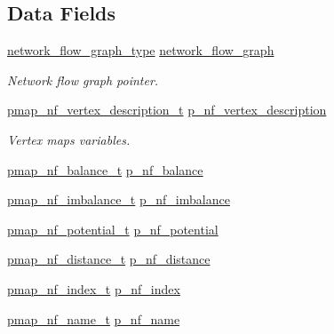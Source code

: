 \subsection*{Data Fields}
\begin{DoxyCompactItemize}
\item 
\hyperlink{classnetwork__flow_abfdb8d1baba183c2b121f8c078b9b640}{network\+\_\+flow\+\_\+graph\+\_\+type} \hyperlink{classnetwork__flow_ad9ab04ac79b18ed458320576340d14d7}{network\+\_\+flow\+\_\+graph}
\begin{DoxyCompactList}\small\item\em Network flow graph pointer. \end{DoxyCompactList}\item 
\hyperlink{classnetwork__flow_a74ecf4431065049cd8c880b82b2b1a2c}{pmap\+\_\+nf\+\_\+vertex\+\_\+description\+\_\+t} \hyperlink{classnetwork__flow_a9c07823ba97add0bb2d94897bc4cb12d}{p\+\_\+nf\+\_\+vertex\+\_\+description}
\begin{DoxyCompactList}\small\item\em Vertex maps variables. \end{DoxyCompactList}\item 
\hyperlink{classnetwork__flow_adb6c2e7def8309b3a5f660dd40a758e8}{pmap\+\_\+nf\+\_\+balance\+\_\+t} \hyperlink{classnetwork__flow_a71c741226f50fdb317a03df0d13c99a1}{p\+\_\+nf\+\_\+balance}
\item 
\hyperlink{classnetwork__flow_a5760a4393bb7caf9af993443e209de05}{pmap\+\_\+nf\+\_\+imbalance\+\_\+t} \hyperlink{classnetwork__flow_a30967a48a78946a8a69ccb96a97c71eb}{p\+\_\+nf\+\_\+imbalance}
\item 
\hyperlink{classnetwork__flow_a27c9b52e67a89ed0f6584017fdf365a5}{pmap\+\_\+nf\+\_\+potential\+\_\+t} \hyperlink{classnetwork__flow_aaa333405d94f8f54981e5788d9530e8a}{p\+\_\+nf\+\_\+potential}
\item 
\hyperlink{classnetwork__flow_a2341f0fc871494e5fa44bc4fe5967a0e}{pmap\+\_\+nf\+\_\+distance\+\_\+t} \hyperlink{classnetwork__flow_afdcfa3c541708c8f34c6ff0629f37645}{p\+\_\+nf\+\_\+distance}
\item 
\hyperlink{classnetwork__flow_a8f87f8e2ed2e6d081d66eba9ea1b284c}{pmap\+\_\+nf\+\_\+index\+\_\+t} \hyperlink{classnetwork__flow_a26b0c291ee60a72f13348727b307f226}{p\+\_\+nf\+\_\+index}
\item 
\hyperlink{classnetwork__flow_a86d192070fc0f9d58337b45c30855c6f}{pmap\+\_\+nf\+\_\+name\+\_\+t} \hyperlink{classnetwork__flow_a82b6c4f79a4b71847e183dd0d119dbcb}{p\+\_\+nf\+\_\+name}
\item 

\end{DoxyCompactItemize}
